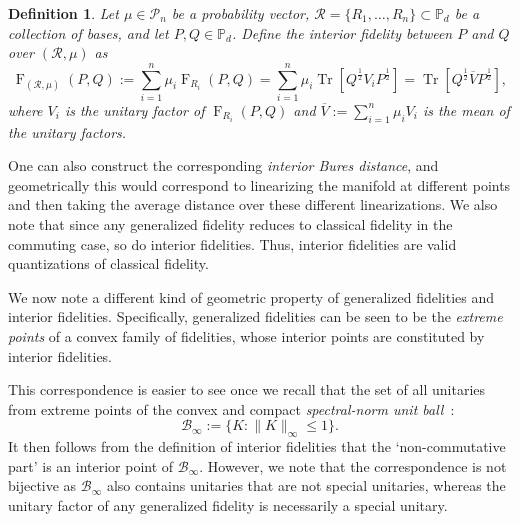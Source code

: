 \documentclass[12pt]{article}
\newtheorem{definition}[theorem]{Definition}
\theoremstyle{definition}
\newcommand{\Fg}[3]{\operatorname{F}_{#3}\!\left(#1, #2\right)}
\begin{document}
\begin{definitionbox}
\begin{definition}
       Let $\mu \in \mathcal P_n$ be a probability vector, $\mathcal R = \{R_1, \dots, R_n\} \subset \mathbb P_d$ be a \emph{collection of bases}, and let $P,Q \in \mathbb P_d$. Define the \emph{interior fidelity} between $P$ \textit{and} $Q$ \textit{over} $(\mathcal R, \mu)$ as
   \begin{equation}
    \Fg{P}{Q}{(\mathcal R, \mu)} :=  \sum_{i=1}^{n} \mu_i \Fg{P}{Q}{R_i} = \sum_{i=1}^{n} \mu_i \operatorname{Tr}\left[Q ^{\frac12} V_i P ^{\frac12} \right] = \operatorname{Tr}\left[Q^{\frac12} \overline{V} P^{\frac12}\right], 
\end{equation}
where $V_i$ is the unitary factor of $\operatorname{F}_{R_i}(P,Q)$ and $\overline{V} := \sum_{i=1}^{n} \mu_i V_i$ is the mean of the unitary factors.
\end{definition}   
\end{definitionbox}

One can also construct the corresponding \textit{interior Bures distance}, and geometrically this would correspond to linearizing the manifold at different points and then taking the average distance over these different linearizations. We also note that since any generalized fidelity reduces to classical fidelity in the commuting case, so do interior fidelities. Thus, interior fidelities are valid quantizations of classical fidelity.

We now note a different kind of geometric property of generalized fidelities and interior fidelities. Specifically, generalized fidelities can be seen to be the \textit{extreme points} of a convex family of fidelities, whose interior points are constituted by interior fidelities.

This correspondence is easier to see once we recall that the set of all unitaries from extreme points of the convex and compact \textit{spectral-norm unit ball}~\cite[Theorem 1.10]{watrous2018theory}:
\begin{equation}
    \mathcal B_\infty := \{K : \|K\|_\infty \leq 1\}.
\end{equation}
It then follows from the definition of interior fidelities that the `non-commutative part' is an interior point of $\mathcal B_\infty$. However, we note that the correspondence is not bijective as $\mathcal B_\infty$ also contains unitaries that are not special unitaries, whereas the unitary factor of any generalized fidelity is necessarily a special unitary. 
\end{document}
